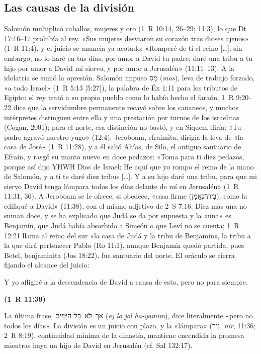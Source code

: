 \documentclass[11pt,letterpaper]{article}
\newcommand{\heb}[1]{\mbox{\foreignlanguage{hebrew}{#1}}}
\newcommand{\fuente}[1]{\par\hfill{\upshape\bfseries\small\textcolor{ladrillo}{#1}}}
\begin{document}
\subsection{Las causas de la división}
Salomón multiplicó caballos, mujeres y oro (1~R 10:14, 26--29; 11:3), lo que Dt 17:16--17 prohibía al rey. «Sus mujeres desviaron su corazón tras dioses ajenos» (1~R 11:4), y el juicio se anuncia ya acotado: «Romperé de ti el reino [\ldots]; sin embargo, no lo haré en tus días, por amor a David tu padre; daré una tribu a tu hijo por amor a David mi siervo, y por amor a Jerusalén» (11:11--13). A la idolatría se sumó la opresión. Salomón impuso \heb{מַס} (\emph{mas}), leva de trabajo forzado, «a todo Israel» (1~R 5:13 [5:27]), la palabra de Éx 1:11 para los tributos de Egipto: el rey trató a su propio pueblo como lo había hecho el faraón. 1~R 9:20--22 dice que la servidumbre permanente recayó sobre los cananeos, y muchos intérpretes distinguen entre ella y una prestación por turnos de los israelitas (Cogan, 2001); para el norte, esa distinción no bastó, y en Siquem diría: «Tu padre agravó nuestro yugo» (12:4). Jeroboam, efraimita, dirigía la leva de «la casa de José» (1~R 11:28), y a él salió Ahías, de Silo, el antiguo santuario de Efraín, y rasgó su manto nuevo en doce pedazos: «Toma para ti diez pedazos, porque así dijo YHWH Dios de Israel: He aquí que yo rompo el reino de la mano de Salomón, y a ti te daré diez tribus [\ldots]. Y a su hijo daré una tribu, para que mi siervo David tenga lámpara todos los días delante de mí en Jerusalén» (1~R 11:31, 36). A Jeroboam se le ofrece, si obedece, «casa firme (\heb{בַיִת־נֶאֱמָן}), como la edifiqué a David» (11:38), con el mismo adjetivo de 2~S 7:16. Diez más una no suman doce, y se ha explicado que Judá se da por supuesta y la «una» es Benjamín, que Judá había absorbido a Simeón o que Leví no se cuenta; 1~R 12:21 llama al reino del sur «la casa de Judá y la tribu de Benjamín», la tribu a la que dirá pertenecer Pablo (Ro 11:1), aunque Benjamín quedó partida, pues Betel, benjaminita (Jos 18:22), fue santuario del norte. El oráculo se cierra fijando el alcance del juicio:

\begin{cita}Y yo afligiré a la descendencia de David a causa de esto, pero no para siempre.\fuente{(1~R 11:39)}\end{cita}

La última frase, \heb{אַךְ לֹא כָל־הַיָּמִים} (\emph{aj lo jol ha-yamim}), dice literalmente «pero no todos los días». La división es un juicio con plazo, y la «lámpara» (\heb{נִיר}, \emph{nir}, 11:36; 2~R 8:19), continuidad mínima de la dinastía, mantiene encendida la promesa mientras haya un hijo de David en Jerusalén (cf. Sal 132:17).
\end{document}
